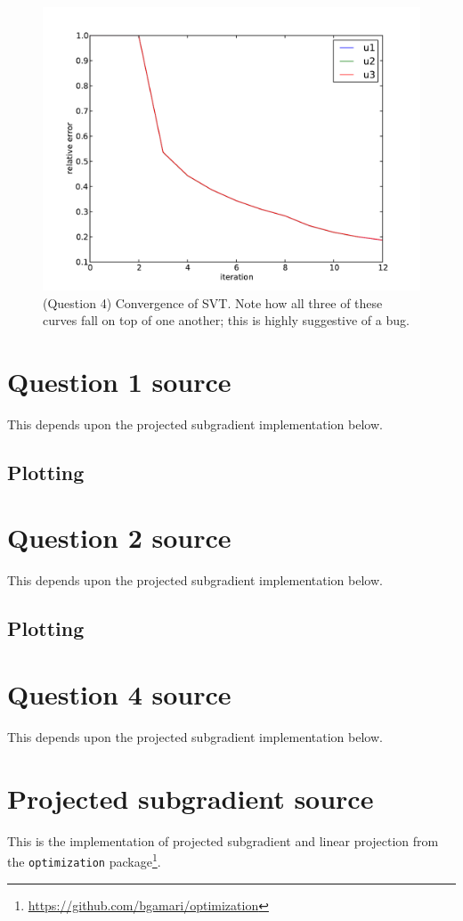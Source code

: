 \documentclass{article}
\begin{document}
\begin{figure}
\center
\includegraphics[scale=0.5]{q4-convergence.pdf}
\caption{(Question 4) Convergence of SVT. Note how all three of these
curves fall on top of one another; this is highly suggestive of a
bug.}
\end{figure}

\appendix

\section{Question 1 source}\label{Q1Source}
This depends upon the projected subgradient implementation below.

\subsection{Plotting}


\section{Question 2 source}\label{Q2Source}
This depends upon the projected subgradient implementation below.

\subsection{Plotting}


\section{Question 4 source}\label{Q4Source}
This depends upon the projected subgradient implementation below.


\section{Projected subgradient source}\label{ProjSubgradSource}
This is the implementation of projected subgradient and linear
projection from the {\tt optimization}
package\footnote{\url{https://github.com/bgamari/optimization}}.


\end{document}
